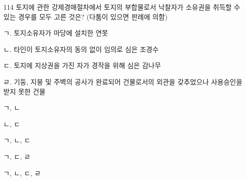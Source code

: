 \begin{question}{114}
토지에 관한 강제경매절차에서 토지의 부합물로서 낙찰자가 소유권을 취득할 수 있는 경우를 모두 고른 것은? (다툼이 있으면 판례에 의함)
\begin{framedtext}
ㄱ. 토지소유자가 마당에 설치한 연못 \par
ㄴ. 타인이 토지소유자의 동의 없이 임의로 심은 조경수 \par
ㄷ. 토지에 지상권을 가진 자가 경작을 위해 심은 감나무 \par
ㄹ. 기둥, 지붕 및 주벽의 공사가 완료되어 건물로서의 외관을 갖추었으나 사용승인을 받지 못한 건물 \par
\end{framedtext}
\begin{choices}
  \item ㄱ, ㄴ
  \item ㄴ, ㄷ
  \item ㄱ, ㄴ, ㄷ
  \item ㄱ, ㄷ, ㄹ
  \item ㄱ, ㄴ, ㄷ, ㄹ
\end{choices}
\end{question}
